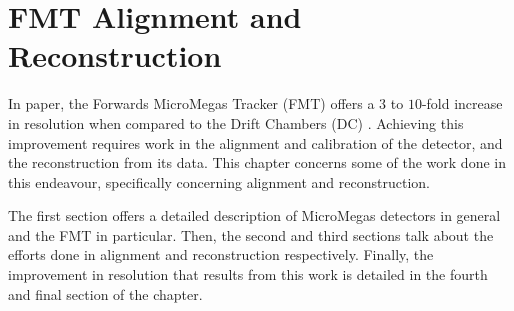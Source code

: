 \section{FMT Alignment and Reconstruction} \label{sec::fmtalignmentandreconstruction}
    In paper, the Forwards MicroMegas Tracker (FMT) offers a $3$ to $10$-fold increase in resolution when compared to the Drift Chambers (DC) \cite{aune2009}.
    Achieving this improvement requires work in the alignment and calibration of the detector, and the reconstruction from its data.
    This chapter concerns some of the work done in this endeavour, specifically concerning alignment and reconstruction.

    The first section offers a detailed description of MicroMegas detectors in general and the FMT in particular.
    Then, the second and third sections talk about the efforts done in alignment and reconstruction respectively.
    Finally, the improvement in resolution that results from this work is detailed in the fourth and final section of the chapter.

    
    
    
    
